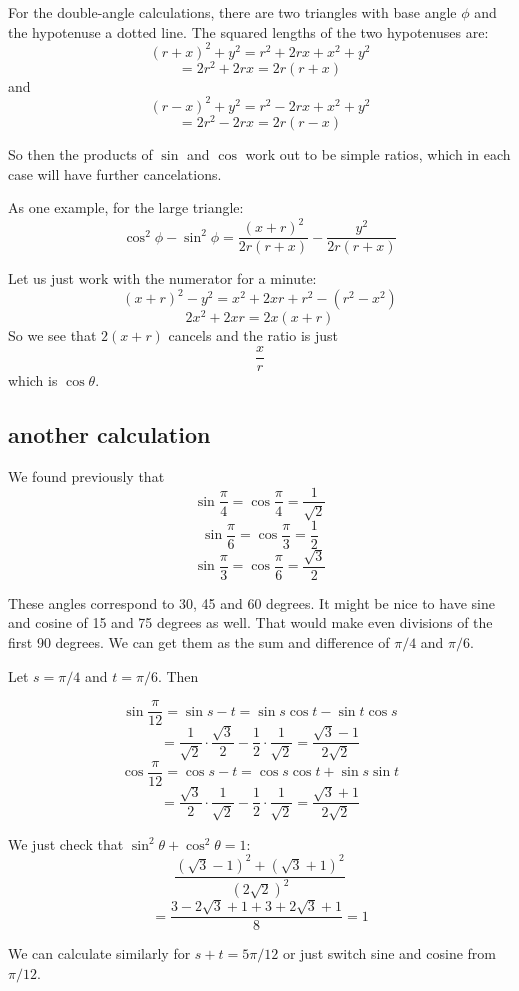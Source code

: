 \documentclass[11pt, oneside]{article}
\begin{document}
For the double-angle calculations, there are two triangles with base angle $\phi$ and the hypotenuse a dotted line.  The squared lengths of the two hypotenuses are:
\[ (r + x)^2 + y^2 = r^2 + 2rx + x^2 + y^2 \]
\[ = 2r^2 + 2rx = 2r(r + x) \]
and 
\[ (r - x)^2 + y^2 = r^2 - 2rx + x^2 + y^2 \]
\[ = 2r^2 - 2rx = 2r(r - x) \]

So then the products of $\sin$ and $\cos$ work out to be simple ratios, which in each case will have further cancelations.

As one example, for the large triangle:
\[ \cos^2 \phi - \sin^2 \phi = \frac{(x+r)^2}{2r(r + x)} - \frac{y^2}{2r(r + x)} \]

Let us just work with the numerator for a minute:
\[ (x+r)^2 - y^2 = x^2 + 2xr + r^2 - (r^2 - x^2) \]
\[ 2x^2 + 2xr = 2x(x + r) \]
So we see that $2(x+r)$ cancels and the ratio is just
\[ \frac{x}{r} \]
which is $\cos \theta$.

\subsection*{another calculation}
We found previously that 
\[ \sin \frac{\pi}{4} = \cos \frac{\pi}{4} = \frac{1}{\sqrt{2}} \]
\[ \sin \frac{\pi}{6} = \cos \frac{\pi}{3} = \frac{1}{2} \]
\[ \sin \frac{\pi}{3} = \cos \frac{\pi}{6} = \frac{\sqrt{3}}{2} \]

These angles correspond to 30, 45 and 60 degrees.  It might be nice to have sine and cosine of 15 and 75 degrees as well.  That would make even divisions of the first 90 degrees.  We can get them as the sum and difference of $\pi/4$ and $\pi/6$.

Let $s = \pi/4$ and $t = \pi/6$.  Then

\[ \sin \frac{\pi}{12} = \sin s - t = \sin s \cos t - \sin t \cos s \]
\[ = \frac{1}{\sqrt{2}} \cdot \frac{\sqrt{3}}{2} - \frac{1}{2} \cdot \frac{1}{\sqrt{2}} = \frac{\sqrt{3} - 1}{2 \sqrt{2}} \]
\[ \cos \frac{\pi}{12} = \cos s - t = \cos s \cos t + \sin s \sin t \]
\[ = \frac{\sqrt{3}}{2} \cdot \frac{1}{\sqrt{2}} - \frac{1}{2} \cdot \frac{1}{\sqrt{2}} = \frac{\sqrt{3} + 1}{2 \sqrt{2}} \]

We just check that $\sin^2 \theta + \cos^2 \theta = 1$:
\[ \frac{(\sqrt{3} - 1)^2 + (\sqrt{3} + 1)^2}{(2 \sqrt{2})^2} \]
\[ = \frac{3 - 2 \sqrt{3} + 1 + 3 + 2 \sqrt{3} + 1}{8} = 1 \]

We can calculate similarly for $s + t = 5 \pi/12$ or just switch sine and cosine from $\pi/12$.
\end{document}
